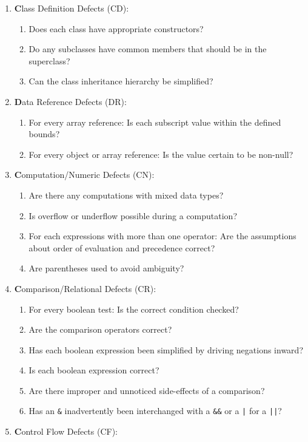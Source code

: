 \begin{enumerate}
\item {\textbf Class Definition Defects (CD):}
  \begin{enumerate}
  \item Does each class have appropriate constructors? %
  \item Do any subclasses have common members that should be in the
  superclass?
\item Can the class inheritance hierarchy be simplified?
  \end{enumerate}
\ifslides
\newpage
\fi
\item {\textbf Data Reference Defects (DR):}
  \begin{enumerate}
  \item For every array reference: Is each subscript value within the defined
  bounds?
\item For every object or array reference: Is the value certain to be
  non-null?
  \end{enumerate}
\item {\textbf Computation/Numeric Defects (CN):}
  \begin{enumerate}
  \item Are there any computations with mixed data types?
  \item Is overflow or underflow possible during a computation?
  \item For each expressions with more than one operator: Are the assumptions
  about order of evaluation and precedence correct?
\item Are parentheses used to avoid ambiguity?
  \end{enumerate}
\ifslides
\newpage
\fi
\item {\textbf Comparison/Relational Defects (CR):}
  \begin{enumerate}
  \item For every boolean test: Is the correct condition checked?
  \item Are the comparison operators correct?
  \item Has each boolean expression been simplified by driving negations
  inward?
\item Is each boolean expression correct?
\item Are there improper and unnoticed side-effects of a comparison?
\item Has an \verb+&+ inadvertently been interchanged with a \verb+&&+ or a
  \verb+|+ for a \verb+||+?
  \end{enumerate}
\ifslides
\newpage
\fi
\item {\textbf Control Flow Defects (CF):}

\end{enumerate}
